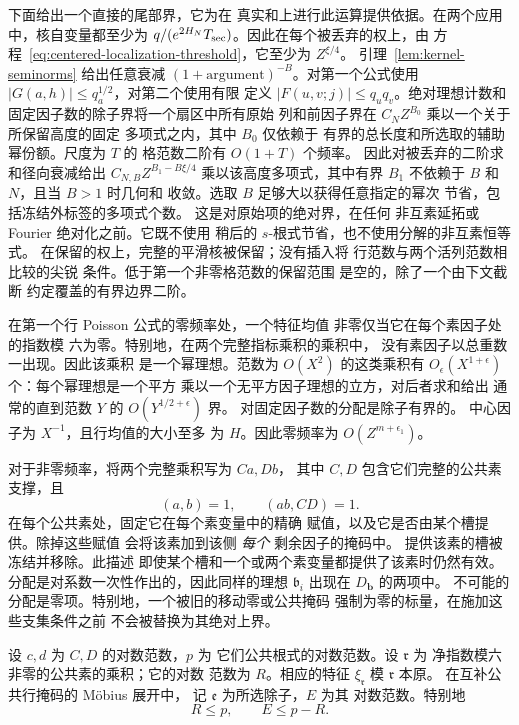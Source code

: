 \documentclass[11pt,a4paper]{article}
\numberwithin{equation}{section}
\numberwithin{figure}{section}
\theoremstyle{definition}
\theoremstyle{remark}
\begin{document}
下面给出一个直接的尾部界，它为在
真实和上进行此运算提供依据。在两个应用中，核自变量都至少为
\(q/(e^{2H_N}T_{\rm sec})\)。因此在每个被丢弃的权上，由
方程~\eqref{eq:centered-localization-threshold}，它至少为 \(Z^{\xi/4}\)。
引理~\ref{lem:kernel-seminorms} 给出任意衰减
\((1+\text{argument})^{-B}\)。对第一个公式使用
\(|G(a,h)|\le q_a^{1/2}\)，对第二个使用有限
定义 \(|F(u,v;j)|\le q_uq_v\)。绝对理想计数和
固定因子数的除子界将一个扇区中所有原始
列和前因子界在 \(C_NZ^{B_0}\) 乘以一个关于所保留高度的固定
多项式之内，其中 \(B_0\) 仅依赖于
有界的总长度和所选取的辅助幂份额。尺度为 \(T\) 的
格范数二阶有 \(O(1+T)\) 个频率。
因此对被丢弃的二阶求和径向衰减给出
\(C_{N,B}Z^{B_1-B\xi/4}\) 乘以该高度多项式，其中有界
\(B_1\) 不依赖于 \(B\) 和 \(N\)，且当 \(B>1\) 时几何和
收敛。选取 \(B\) 足够大以获得任意指定的幂次
节省，包括冻结外标签的多项式个数。
这是对原始项的绝对界，在任何
非互素延拓或 Fourier 绝对化之前。它既不使用
稍后的 \(s\)-根式节省，也不使用分解的非互素恒等式。
在保留的权上，完整的平滑核被保留；没有插入将
行范数与两个活列范数相比较的尖锐
条件。低于第一个非零格范数的保留范围
是空的，除了一个由下文截断
约定覆盖的有界边界二阶。

在第一个行 Poisson 公式的零频率处，一个特征均值
非零仅当它在每个素因子处的指数模
六为零。特别地，在两个完整指标乘积的乘积中，
没有素因子以总重数一出现。因此该乘积
是一个幂理想。范数为 \(O(X^2)\) 的这类乘积有
\(O_\epsilon(X^{1+\epsilon})\) 个：每个幂理想是一个平方
乘以一个无平方因子理想的立方，对后者求和给出
通常的直到范数 \(Y\) 的 \(O(Y^{1/2+\epsilon})\) 界。
对固定因子数的分配是除子有界的。
中心因子为 \(X^{-1}\)，且行均值的大小至多
为 \(H\)。因此零频率为 \(O(Z^{m+\epsilon_1})\)。

对于非零频率，将两个完整乘积写为 \(Ca,Db\)，
其中 \(C,D\) 包含它们完整的公共素支撑，且
\[
 (a,b)=1,\qquad (ab,CD)=1.
\]
在每个公共素处，固定它在每个素变量中的精确
赋值，以及它是否由某个槽提供。除掉这些赋值
会将该素加到该侧 \emph{每个} 剩余因子的掩码中。
提供该素的槽被冻结并移除。此描述
即使某个槽和一个或两个素变量都提供了该素时仍然有效。
分配是对系数一次性作出的，因此同样的理想
\(\mathfrak b_i\) 出现在 \(D_{\mathbf b}\) 的两项中。
不可能的分配是零项。特别地，一个被旧的移动零或公共掩码
强制为零的标量，在施加这些支集条件之前
不会被替换为其绝对上界。

设 \(c,d\) 为 \(C,D\) 的对数范数，\(p\) 为
它们公共根式的对数范数。设 \(\mathfrak r\) 为
净指数模六非零的公共素的乘积；它的对数
范数为 \(R\)。相应的特征
\(\xi_{\mathfrak r}\) 模 \(\mathfrak r\) 本原。
在互补公共行掩码的 M\"obius 展开中，
记 \(\mathfrak e\) 为所选除子，\(E\) 为其
对数范数。特别地
\[
 R\le p,\qquad E\le p-R.
\]
\end{document}
